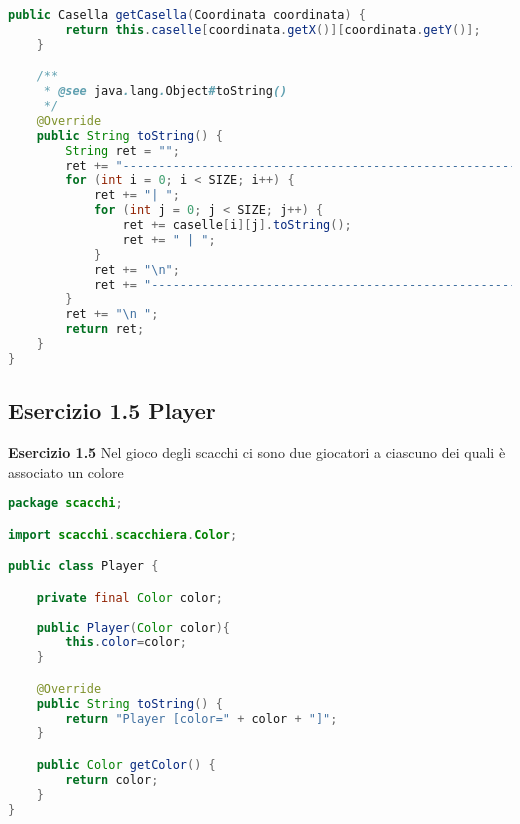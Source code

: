 \documentclass{article}
\begin{document}
\begin{lstlisting}[language=Java,escapechar=|]
	public Casella getCasella(Coordinata coordinata) {
		return this.caselle[coordinata.getX()][coordinata.getY()];
	}

	/**
	 * @see java.lang.Object#toString()
	 */
	@Override
	public String toString() {
		String ret = "";
		ret += "---------------------------------------------------------------------------------------------------\n";
		for (int i = 0; i < SIZE; i++) {
			ret += "| ";
			for (int j = 0; j < SIZE; j++) {
				ret += caselle[i][j].toString();
				ret += " | ";
			}
			ret += "\n";
			ret += "---------------------------------------------------------------------------------------------------\n";
		}
		ret += "\n ";
		return ret;
	}
}
\end{lstlisting}

\subsection{Esercizio 1.5 Player}
\begin{framed}
\textbf{Esercizio 1.5} Nel gioco degli scacchi ci sono due giocatori a ciascuno dei quali \`e associato un colore
\end{framed}
\begin{lstlisting}[language=Java,escapechar=|]
package scacchi;

import scacchi.scacchiera.Color;

public class Player {

	private final Color color;
	
	public Player(Color color){
		this.color=color;
	}

	@Override
	public String toString() {
		return "Player [color=" + color + "]";
	}

	public Color getColor() {
		return color;
	}
}
\end{lstlisting}
\end{document}
